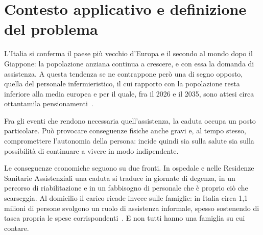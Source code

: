 %
%
%
%

\chapter{Contesto applicativo e definizione del problema}
\label{cap:contesto}


L'Italia si conferma il paese più vecchio d'Europa e il secondo al mondo dopo
il Giappone: la popolazione anziana continua a crescere, e con essa la
domanda di assistenza. A questa tendenza se ne contrappone però una di segno
opposto, quella del personale infermieristico, il cui rapporto con la
popolazione resta inferiore alla media europea e per il quale, fra il 2026 e
il 2035, sono attesi circa ottantamila pensionamenti~\cite{fnopi}.

Fra gli eventi che rendono necessaria quell'assistenza, la caduta occupa un
posto particolare. Può provocare conseguenze fisiche anche gravi e, al tempo
stesso, compromettere l'autonomia della persona: incide quindi sia sulla
salute sia sulla possibilità di continuare a vivere in modo indipendente.

Le conseguenze economiche seguono su due fronti. In ospedale e nelle
Residenze Sanitarie Assistenziali una caduta si traduce in giornate di
degenza, in un percorso di riabilitazione e in un fabbisogno di personale che
è proprio ciò che scarseggia. Al domicilio il carico ricade invece sulle
famiglie: in Italia circa 1,1 milioni di persone svolgono un ruolo di
assistenza informale, spesso sostenendo di tasca propria le spese
corrispondenti~\cite{fnopi}. E non tutti hanno una famiglia su cui contare.

